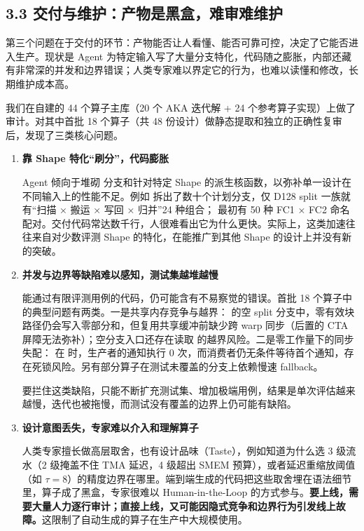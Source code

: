 \subsection{3.3 交付与维护：产物是黑盒，难审难维护}
第三个问题在于交付的环节：产物能否让人看懂、能否可靠可控，决定了它能否进入生产。现状是 Agent 为特定输入写了大量分支特化，代码随之膨胀，内部还藏有非常深的并发和边界错误；人类专家难以界定它的行为，也难以读懂和修改，长期维护成本高。


我们在自建的 44 个算子主库（20 个 AKA 迭代解 + 24 个参考算子实现）上做了审计。对其中首批 18 个算子（共 48 份设计）做静态提取和独立的正确性复审后，发现了三类核心问题。


\begin{enumerate}[start=1]
\item
\textbf{靠 Shape 特化“刷分”，代码膨胀}


Agent 倾向于堆砌  分支和针对特定 Shape 的派生核函数，以弥补单一设计在不同输入上的性能不足。例如  拆出了数十个计划分支，仅 D128 split 一族就有“扫描 × 搬运 × 写回 × 归并”24 种组合； 最初有 50 种 FC1 × FC2 命名配对。交付代码常达数千行，人很难看出它为什么更快。实际上，这类加速往往来自对少数评测 Shape 的特化，在能推广到其他 Shape 的设计上并没有新的突破。


\item
\textbf{并发与边界等缺陷难以感知，测试集越堆越慢}


能通过有限评测用例的代码，仍可能含有不易察觉的错误。首批 18 个算子中的典型问题有两类。一是共享内存竞争与越界： 的空 split 分支中，零有效块路径仍会写入零部分和，但复用共享缓冲前缺少跨 warp 同步（后置的 CTA 屏障无法弥补）；空分支入口还存在读取  的越界风险。二是零工作量下的同步失配： 在  时，生产者的通知执行 0 次，而消费者仍无条件等待首个通知，存在死锁风险。另有部分算子在测试未覆盖的分支上依赖慢速 fallback。

要拦住这类缺陷，只能不断扩充测试集、增加极端用例，结果是单次评估越来越慢，迭代也被拖慢，而测试没有覆盖的边界上仍可能有缺陷。


\item
\textbf{设计意图丢失，专家难以介入和理解算子}


人类专家擅长做高层取舍，也有设计品味（Taste），例如知道为什么选 3 级流水（2 级掩盖不住 TMA 延迟，4 级超出 SMEM 预算），或者延迟重缩放阈值（如 $\tau=8$）的精度边界在哪里。端到端生成的代码把这些取舍埋在语法细节里，算子成了黑盒，专家很难以 Human-in-the-Loop 的方式参与。\textbf{要上线，需要大量人力逐行审计；直接上线，又可能因隐式竞争和边界行为引发线上故障。}这限制了自动生成的算子在生产中大规模使用。


\end{enumerate}
\SourceSeparator
\clearpage
